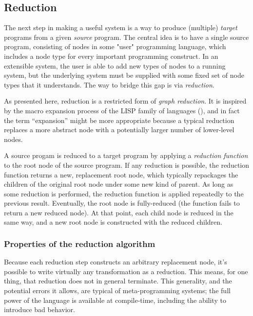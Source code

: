 \subsection{Reduction}\label{reduction}
The next step in making a useful system is a way to produce (multiple) \emph{target} programs from a given \emph{source} program. The central idea is to have a single source program, consisting of nodes in some "user" programming language, which includes a node type for every important programming construct. In an extensible system, the user is able to add new types of nodes to a running system, but the underlying system must be supplied with some fixed set of node types that it understands. The way to bridge this gap is via \emph{reduction}.

As presented here, reduction is a restricted form of \emph{graph reduction}. It is inspired by the macro expansion process of the LISP family of languages (), and in fact the term ``expansion'' might be more appropriate because a typical reduction replaces a more abstract node with a potentially larger number of lower-level nodes.

A source progam is reduced to a target program by applying a \emph{reduction function} to the root node of the source program. If any reduction is possible, the reduction function returns a new, replacement root node, which typically repackages the children of the original root node under some new kind of parent. As long as some reduction is performed, the reduction function is applied repeatedly to the previous result. Eventually, the root node is fully-reduced (the function fails to return a new reduced node). At that point, each child node is reduced in the same way, and a new root node is constructed with the reduced children.




\subsubsection{Properties of the reduction algorithm}
Because each reduction step constructs an arbitrary replacement node, it's possible to write virtually any transformation as a reduction. This means, for one thing, that reduction does not in general terminate. This generality, and the potential errors it allows, are typical of meta-programming systems; the full power of the language is available at compile-time, including the ability to introduce bad behavior.

